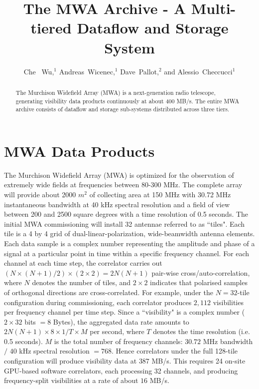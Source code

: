 



\title{The MWA Archive - A Multi-tiered Dataflow and Storage System}
\author{Che~ Wu,$^1$ Andreas~Wicenec,$^1$ Dave~Pallot,$^2$ and Alessio~Checcucci$^1$
}


\begin{abstract}
The Murchison Widefield Array (MWA) is a next-generation radio telescope, generating visibility data products continuously at about 400 MB/s. The entire MWA archive consists of dataflow and storage sub-systems distributed across three tiers. %
\end{abstract}


\section{MWA Data Products}
The Murchison Widefield Array (MWA) is optimized for the observation of extremely wide fields at frequencies between 80-300 MHz. 
The complete array will provide about 2000 $m^2$ of collecting area at 150 MHz with 30.72 MHz instantaneous bandwidth at 40 kHz spectral resolution and a field of view between 200 and 2500 square degrees with 
a time resolution of 0.5 seconds. The initial MWA commissioning will install 32 antennae referred to as ``tiles". Each tile is a 4 by 4 grid of dual-linear-polarization, wide-beamwidth antenna elements. Each data sample is a complex number representing the amplitude and phase of a signal at a particular point in time within a specific frequency channel. For each channel at each time step, the correlator carries out \((N \times (N + 1) / 2) \times (2  \times 2) = 2N(N+1) \) pair-wise cross/auto-correlation, where \(N\) denotes the number of tiles, and \(2 \times 2 \) indicates that polarised samples of orthogonal directions are cross-correlated. For example,  under the \(N=32\)-tile configuration during commissioning, each correlator produces \(2,112\) visibilities per frequency channel per time step. 
Since a ``visibility" is a complex number (\(2 \times 32\) bits \(= 8\) Bytes), the aggregated data rate amounts to \( 2N(N+1) \times 8 \times 1/T \times M\) per second, where \(T\) denotes the time resolution (i.e. 0.5 seconds). \(M\) is the total number of frequency channels: \(30.72\) MHz bandwidth \(/\) \(40\) kHz spectral resolution \(= 768\). Hence correlators under the full 128-tile configuration will produce visibility data at \(387\) MB/s. This requires 24 on-site GPU-based software correlators, each processing 32 channels, and producing frequency-split visibilities at a rate of about \(16\) MB/s. 

